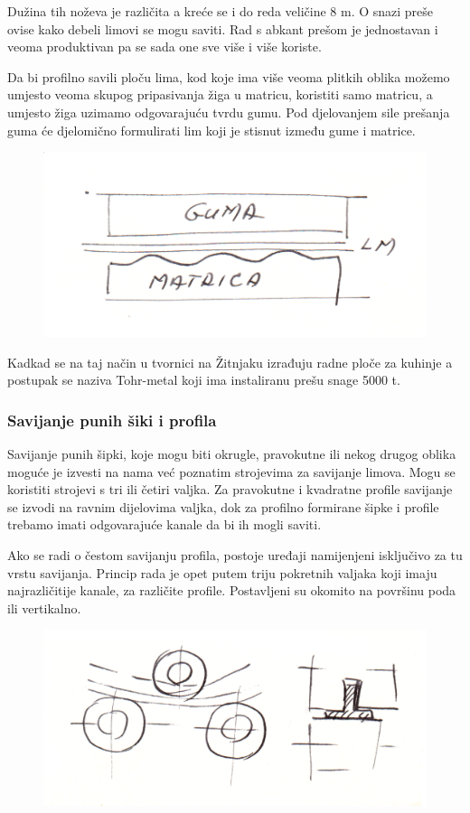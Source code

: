 \documentclass[a4paper,12pt]{article}
\numberwithin{figure}{section}
\begin{document}
\FloatBarrier
Dužina tih noževa je različita a kreće se i do reda veličine 8 m. O snazi preše ovise kako debeli limovi se mogu saviti. Rad s abkant prešom je jednostavan i veoma produktivan pa se sada one sve više i više koriste.\par
Da bi profilno savili ploču lima, kod koje ima više veoma plitkih oblika možemo umjesto veoma skupog pripasivanja žiga u matricu, koristiti samo matricu, a umjesto žiga uzimamo odgovarajuću tvrdu gumu. Pod djelovanjem sile prešanja guma će djelomično formulirati lim koji je stisnut između gume i matrice.
\begin{figure}[!h]
\centering
\includegraphics[scale=0.15]{image_49-2.png}
\end{figure}
\FloatBarrier
Kadkad se na taj način u tvornici na Žitnjaku izrađuju radne ploče za kuhinje a postupak se naziva Tohr-metal koji ima instaliranu prešu snage 5000 t.
\subsubsection{Savijanje punih šiki i profila}
Savijanje punih šipki, koje mogu biti okrugle, pravokutne ili nekog drugog oblika moguće je izvesti na nama već poznatim strojevima za savijanje limova. Mogu se koristiti strojevi s tri ili četiri valjka. Za pravokutne i kvadratne profile savijanje se izvodi na ravnim dijelovima valjka, dok za profilno formirane šipke i profile trebamo imati odgovarajuće kanale da bi ih mogli saviti.\par
Ako se radi o čestom savijanju profila, postoje uređaji namijenjeni isključivo za tu vrstu savijanja. Princip rada je opet putem triju pokretnih valjaka koji imaju najrazličitije kanale, za različite profile. Postavljeni su okomito na površinu poda ili vertikalno.
\begin{figure}[!h]
\centering
\includegraphics[scale=0.12]{image_49-3.png}
\end{figure}
\FloatBarrier
\end{document}
